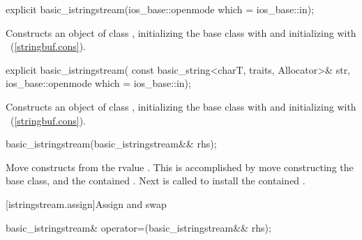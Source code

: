 %
\begin{itemdecl}
explicit basic_istringstream(ios_base::openmode which = ios_base::in);
\end{itemdecl}

\begin{itemdescr}
\pnum
\effects
Constructs an object of class
,
initializing the base class with
and initializing  with
~(\ref{stringbuf.cons}).
\end{itemdescr}

%
\begin{itemdecl}
explicit basic_istringstream(
                const basic_string<charT, traits, Allocator>& str,
                ios_base::openmode which = ios_base::in);
\end{itemdecl}

\begin{itemdescr}
\pnum
\effects
Constructs an object of class
,
initializing the base class with
and initializing  with
~(\ref{stringbuf.cons}).
\end{itemdescr}

%
\begin{itemdecl}
basic_istringstream(basic_istringstream&& rhs);
\end{itemdecl}

\begin{itemdescr}
\pnum
\effects Move constructs from the rvalue . This
is accomplished by move constructing the base class, and the contained
.
Next  is called to
install the contained .
\end{itemdescr}

[istringstream.assign]{Assign and swap}

%
%
\begin{itemdecl}
basic_istringstream& operator=(basic_istringstream&& rhs);
\end{itemdecl}

